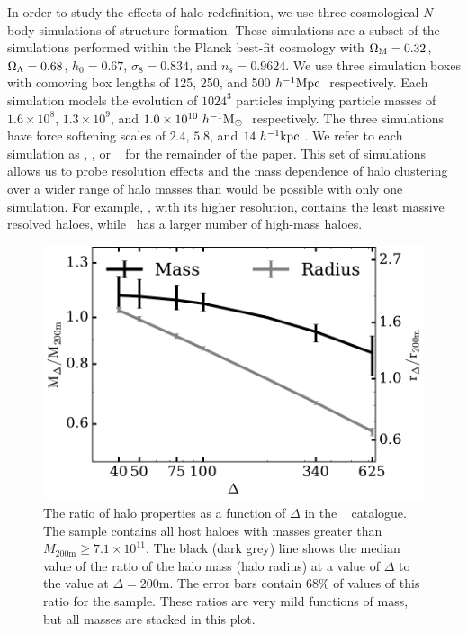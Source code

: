 \documentclass[usenatbib,fleqn]{mnras}
\begin{document}
In order to study the effects of halo redefinition, we use three cosmological $N$-body simulations of structure formation. These simulations are a subset of the  \citet{diemer_kravtsov15} simulations performed within the Planck best-fit cosmology with $\Omega_{\mathrm{M}} = 0.32$, $\Omega_{\Lambda} = 0.68$, $h_0 = 0.67$, $\sigma_8 = 0.834$, and $n_s = 0.9624$. We use three simulation boxes with comoving box lengths of 125, 250, and 500$\ h^{-1}\mathrm{Mpc}~$ respectively. Each simulation models the evolution of $1024^3$ particles implying particle masses of $1.6 \times 10^8$, $1.3 \times 10^9$, and $1.0 \times 10^{10}\ h^{-1}\mathrm{M}_{\odot}~$ respectively. The three simulations have force softening scales of $2.4$, $5.8$, and $14 \ h^{-1}\mathrm{kpc}~$. We refer to each simulation as \simA, \simB, or \simC~ for the remainder of the paper. This set of simulations allows us to probe resolution effects and the mass dependence of halo clustering over a wider range of halo masses than would be possible with only one simulation. For example, \simA, with its higher resolution, contains the least massive resolved haloes, while \simC~has a larger number of high-mass haloes.

\begin{figure}
\centering
\includegraphics[width=\columnwidth]{massvsdelta_l0250.pdf}
\caption{
The ratio of halo properties as a function of $\Delta$ in the \simB~ catalogue. The sample contains all host haloes with masses greater than $M_{200\mathrm{m}} \ge 7.1 \times 10^{11}$. The black (dark grey) line shows the median value of the ratio of the halo mass (halo radius) at a value of $\Delta$ to the value at $\Delta=200\mathrm{m}$. The error bars contain 68\% of values of this ratio for the sample. These ratios are 
very mild functions of mass, but all masses are stacked in this plot.}
\label{fig:deltacompare}
\end{figure}
\end{document}
